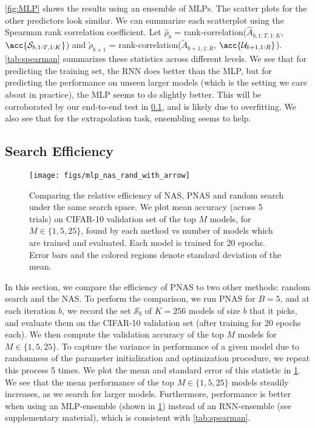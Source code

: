 \documentclass[runningheads]{llncs}
\newcommand{\NAS}{NAS}
\newcommand{\NAScell}{\NAS}
\begin{document}
\cref{fig:MLP} shows the results
using an ensemble of MLPs.
The scatter plots for the other predictors look similar.
We can summarize each scatterplot using the Spearman rank correlation coefficient.
Let  $\hat{\rho}_{b}$ = rank-correlation($\hat{A}_{b,1:T,1:K}$,  $\acc{\mathcal{S}_{b,1:T,1:K}}$)
and
 $\tilde{\rho}_{b+1}$ = rank-correlation($\tilde{A}_{b+1,1:R}$,  $\acc{\mathcal{U}_{b+1,1:R}}$).
\cref{tab:spearman} summarizes these statistics across different levels.
We  see that for predicting the training set, the RNN does better than the MLP,
but for predicting the performance on unseen larger models
(which is the setting we care about in practice),
the MLP seems to do slightly better.
This will be corroborated by our end-to-end test in \cref{sec:efficiency}, and is likely due to overfitting.
We also see that for the extrapolation task, ensembling seems to help.

\subsection{Search Efficiency}\label{sec:efficiency}\begin{figure}[t]
    \centering
    \texttt{[image: figs/mlp\_nas\_rand\_with\_arrow]}
    \caption{
    Comparing the relative efficiency of NAS,  PNAS and random search under the same search space.
    We plot mean accuracy (across 5 trials) on CIFAR-10 validation set of the top
    $M$ models, for $M \in \{1,5,25\}$, found by each method
    vs number of models which are trained and evaluated.
    Each model is trained for 20 epochs.
    Error bars and the colored regions denote standard deviation of the mean.
    }
    \label{fig:efficiency}
\end{figure}In this section, we compare the efficiency of PNAS to two other methods:
random search and the \NAScell\method.
To perform the comparison,
we run PNAS for $B = 5$,
and at each iteration $b$, we record the set $\mathcal{S}_b$  of $K=256$ models of size $b$
that it picks,
and evaluate them on the CIFAR-10 validation set (after training for 20 epochs each).
We then compute the validation accuracy of the top $M$ models
for $M \in \{1,5,25\}$.
To capture the variance in performance of a given model due to randomness of
the parameter initialization and optimization procedure, we repeat this process 5 times.
We plot the mean and standard error of this statistic in \cref{fig:efficiency}.
We see that the mean performance of the top $M \in \{1,5,25\}$ models steadily increases, as we search
for larger models.
Furthermore, performance is better when using an MLP-ensemble (shown in \cref{fig:efficiency})
instead of an RNN-ensemble (see supplementary material),
which is consistent with
\cref{tab:spearman}.
\end{document}
